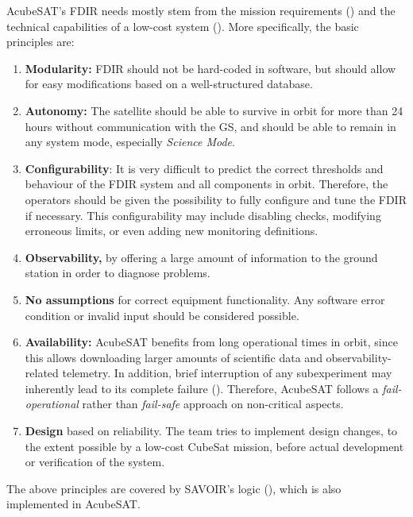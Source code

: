 \documentclass[a4paper,nobib,final]{tufte-book}
\begin{document}
AcubeSAT's \acs{FDIR} needs mostly stem from the mission requirements () and the technical capabilities of a low-cost system (). More specifically, the basic principles are:
\begin{enumerate}
	\item \textbf{Modularity:} \acs{FDIR} should not be hard-coded in software, but should allow for easy modifications based on a well-structured database.
		\item \textbf{Autonomy:} The satellite should be able to survive in orbit for more than \SI{24}{} hours without communication with the \acs{GS}, and should be able to remain in any system mode, especially \emph{Science Mode}.
		\item \textbf{Configurability}: It is very difficult to predict the correct thresholds and behaviour of the \acs{FDIR} system and all components in orbit. Therefore, the operators should be given the possibility to fully configure and tune the \acs{FDIR} if necessary. This configurability may include disabling checks, modifying erroneous limits, or even adding new monitoring definitions.
		\item \textbf{Observability,} by offering a large amount of information to the ground station in order to diagnose problems.
		\item \textbf{No assumptions} for correct equipment functionality. Any software error condition or invalid input should be considered possible.
		\item \textbf{Availability:} AcubeSAT benefits from long operational times in orbit, since this allows downloading larger amounts of scientific data and observability-related telemetry. In addition, brief interruption of any subexperiment may inherently lead to its complete failure (). Therefore, AcubeSAT follows a \emph{fail-operational} rather than \emph{fail-safe} approach on non-critical aspects.
		\item \textbf{Design} based on reliability. The team tries to implement design changes, to the extent possible by a low-cost CubeSat mission, before actual development or verification of the system.
	\end{enumerate}
	
The above principles are covered by \acs{SAVOIR}'s logic (), which is also implemented in AcubeSAT.
\end{document}
